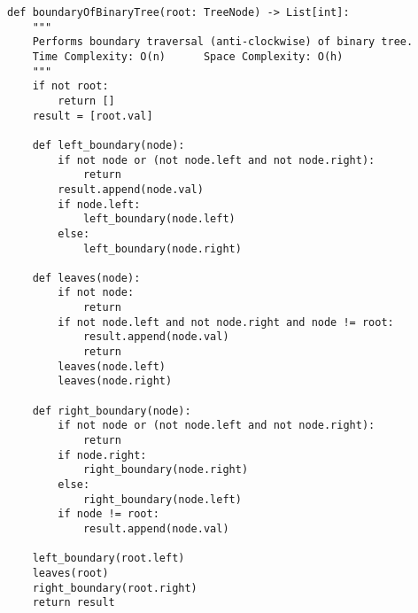 \begin{verbatim}
def boundaryOfBinaryTree(root: TreeNode) -> List[int]:
    """
    Performs boundary traversal (anti-clockwise) of binary tree.
    Time Complexity: O(n)      Space Complexity: O(h)
    """
    if not root:
        return []
    result = [root.val]
    
    def left_boundary(node):
        if not node or (not node.left and not node.right):
            return
        result.append(node.val)
        if node.left:
            left_boundary(node.left)
        else:
            left_boundary(node.right)
    
    def leaves(node):
        if not node:
            return
        if not node.left and not node.right and node != root:
            result.append(node.val)
            return
        leaves(node.left)
        leaves(node.right)
    
    def right_boundary(node):
        if not node or (not node.left and not node.right):
            return
        if node.right:
            right_boundary(node.right)
        else:
            right_boundary(node.left)
        if node != root:
            result.append(node.val)
    
    left_boundary(root.left)
    leaves(root)
    right_boundary(root.right)
    return result
\end{verbatim}

% 
